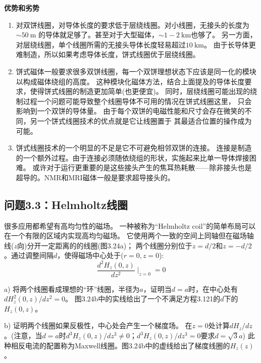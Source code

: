 \textbf{优势和劣势}
\begin{enumerate}
	\item 对双饼线圈，对导体长度的要求低于层绕线圈。对小线圈，无接头的长度为$\sim 50\ \mathrm{m}$
	的导体就足够了。甚至对于大型磁体，$\sim 1-2\ \mathrm{km}$也够了。
	另一方面，对层绕线圈，单个线圈所需的无接头导体长度轻易超过$10\ \mathrm{km}$。
	由于长导体更难制造，所以如果考虑导体长度，饼式线圈优于层绕线圈。

	\item 饼式磁体一般要求很多双饼线圈，每一个双饼理想状态下应该是同一化的模块以构成磁体绕组的高度。
	这种模块化磁体方法，结合上面提及的导体长度要求，使得饼式线圈的制造更加简单(也更便宜)。
	同时，层绕线圈可能出现的绕制过程一个问题可能导致整个线圈导体不可用的情况在饼式线圈这里，
	只会影响到一个双饼的导体量。
	由于每个双饼的电磁性能和尺寸会存在微笑的不同，另一个饼式线圈技术的优点就是它让线圈置于
	其最适合位置的操作成为可能。

	\item 饼式线圈技术的一个明显的不足是它不可避免相邻双饼的连接。
	连接是制造的一个额外过程。由于连接必须随依绕组的形状，实施起来比单一导体焊接困难。
	或许对于运行更重要的是这些接头产生的焦耳热耗散——除非接头也是超导的。NMR和MRI磁体一般是要求超导接头的。
\end{enumerate}



\subsection{问题3.3：Helmholtz线圈}
很多应用都希望有高均匀性的磁场。
一种被称为“Helmholtz coil”的简单布局可以在一个有限的区域内实现高均匀磁场。
它使用两个一致的空间上同轴但在磁场轴线($z$向)分开一定距离的的线圈(图3.24a)；
两个线圈分别位于$z = d/2$和$z = −d/2$。通过调整间隔$d$，使得磁场中心处于($r=0,z=0$):
\begin{equation}%
\frac{d^2H_z(0,z)}{dz^2}\mid_{z=0}=0
\end{equation}

a) 将两个线圈看成理想的“环”线圈，半径为$a$，证明当$d=a$时，在中心处有$dH^2_z(0, z)/dz^2 = 0$。
图3.24b中的实线给出了一个不满足方程3.121的$d$下的$H_z(0, z)$。

b) 证明两个线圈如果反极性，中心处会产生一个梯度场。
在$z=0$处计算$dH_z/dz$。(注意，当$d=a$时$d^3H_z(0,z)/dz^3 \neq 0$；$d^3H_z(0,z)/dz^3=0$要求$d=\sqrt{3}a$) 
此种相反电流的配置称为Maxwell线圈。图3.24b中的虚线给出了梯度线圈的$H_z(z)$。

